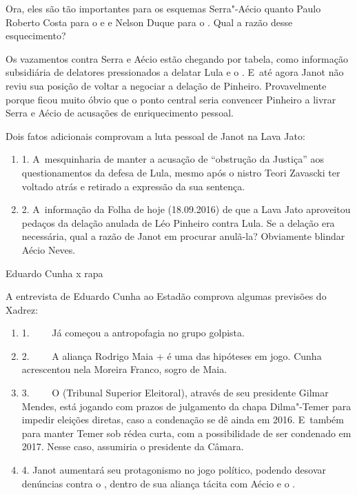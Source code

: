 Ora, eles são tão importantes para os esquemas Serra"-Aécio quanto Paulo
Roberto Costa para o  e  e Nelson Duque para o . Qual a razão
desse esquecimento?

Os vazamentos contra Serra e Aécio estão chegando por tabela, como
informação subsidiária de delatores pressionados a delatar Lula e o .
E~até agora Janot não reviu sua posição de voltar a negociar a delação
de Pinheiro. Provavelmente porque ficou muito óbvio que o ponto central
seria convencer Pinheiro a livrar Serra e Aécio de acusações de
enriquecimento pessoal.

Dois fatos adicionais comprovam a luta pessoal de Janot na Lava Jato:

\begin{enumerate}
\itemsep1pt\parskip0pt
\item
  1. A~mesquinharia de manter a acusação de ``obstrução da Justiça'' aos
  questionamentos da defesa de Lula, mesmo após o nistro Teori
  Zavascki ter voltado atrás e retirado a expressão da sua sentença.
\item
  2. A~informação da Folha de hoje (18.09.2016) de que a Lava Jato
  aproveitou pedaços da delação anulada de Léo Pinheiro contra Lula. Se
  a delação era necessária, qual a razão de Janot em procurar anulã-la?
  Obviamente blindar Aécio Neves.
\end{enumerate}

Eduardo Cunha x rapa

A entrevista de Eduardo Cunha ao Estadão comprova algumas previsões do
Xadrez:

\begin{enumerate}
\itemsep1pt\parskip0pt
\item
  1.~~~~ Já começou a antropofagia no grupo golpista.
\item
  2.~~~~ A aliança Rodrigo Maia +  é uma das hipóteses em jogo.
  Cunha acrescentou nela Moreira Franco, sogro de Maia.
\item
  3.~~~~ O  (Tribunal Superior Eleitoral), através de seu presidente
  Gilmar Mendes, está jogando com prazos de julgamento da chapa
  Dilma"-Temer para impedir eleições diretas, caso a condenação se dê
  ainda em 2016. E~também para manter Temer sob rédea curta, com a
  possibilidade de ser condenado em 2017. Nesse caso, assumiria o
  presidente da Câmara.
\item
  4. Janot aumentará seu protagonismo no jogo político, podendo desovar
  denúncias contra o , dentro de sua aliança tácita com Aécio e o
  .
\end{enumerate}
